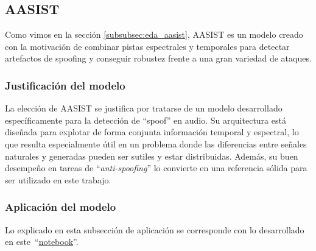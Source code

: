\subsection{AASIST}
\label{subsubsec:met_aasist}
Como vimos en la sección \ref{subsubsec:eda_aasist}, AASIST es un modelo creado con la motivación de combinar pistas espectrales y temporales para detectar artefactos de spoofing y conseguir robustez frente a una gran variedad de ataques.

\subsubsection*{Justificación del modelo}

La elección de AASIST se justifica por tratarse de un modelo desarrollado específicamente para la detección de ``spoof'' en audio. Su arquitectura está diseñada para explotar de forma conjunta información temporal y espectral, lo que resulta especialmente útil en un problema donde las diferencias entre señales naturales y generadas pueden ser sutiles y estar distribuidas. Además, su buen desempeño en tareas de ``\textit{anti-spoofing}'' lo convierte en una referencia sólida para ser utilizado en este trabajo.

\subsubsection*{Aplicación del modelo}
Lo explicado en esta subsección de aplicación se corresponde con lo desarrollado en este~``\href{https://github.com/NILGroup/tfg-2526-xplicavoz/blob/main/Modelos/German/AASIST_modelo.ipynb}{notebook}''.

